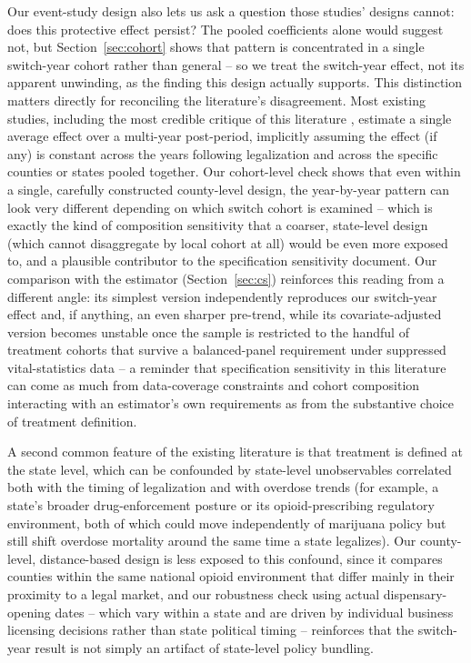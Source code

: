 \documentclass{article}
\begin{document}
Our event-study design also lets us ask a question those studies' designs cannot: does this protective effect
persist? The pooled coefficients alone would suggest not, but Section~\ref{sec:cohort} shows that pattern is
concentrated in a single switch-year cohort rather than general -- so we treat the switch-year effect, not its
apparent unwinding, as the finding this design actually supports. This distinction matters directly for
reconciling the literature's disagreement. Most existing studies, including the most credible critique of this
literature \citep{MathurRuhm2023}, estimate a single average effect over a multi-year post-period, implicitly
assuming the effect (if any) is constant across the years following legalization and across the specific counties
or states pooled together. Our cohort-level check shows that even within a single, carefully constructed
county-level design, the year-by-year pattern can look very different depending on which switch cohort is
examined -- which is exactly the kind of composition sensitivity that a coarser, state-level design (which cannot
disaggregate by local cohort at all) would be even more exposed to, and a plausible contributor to the
specification sensitivity \citet{MathurRuhm2023} document. Our comparison with the \citet{CallawaySantAnna2021}
estimator (Section~\ref{sec:cs}) reinforces this reading from a different angle: its simplest version independently
reproduces our switch-year effect and, if anything, an even sharper pre-trend, while its covariate-adjusted
version becomes unstable once the sample is restricted to the handful of treatment cohorts that survive a
balanced-panel requirement under suppressed vital-statistics data -- a reminder that specification sensitivity
in this literature can come as much from data-coverage constraints and cohort composition interacting with an
estimator's own requirements as from the substantive choice of treatment definition.

A second common feature of the existing literature is that treatment is defined at the state level, which can be
confounded by state-level unobservables correlated both with the timing of legalization and with overdose trends
(for example, a state's broader drug-enforcement posture or its opioid-prescribing regulatory environment, both of
which could move independently of marijuana policy but still shift overdose mortality around the same time a state
legalizes). Our county-level, distance-based design is less exposed to this confound, since it compares counties
within the same national opioid environment that differ mainly in their proximity to a legal market, and our
robustness check using actual dispensary-opening dates -- which vary within a state and are driven by individual
business licensing decisions rather than state political timing -- reinforces that the switch-year result is not
simply an artifact of state-level policy bundling.
\end{document}
